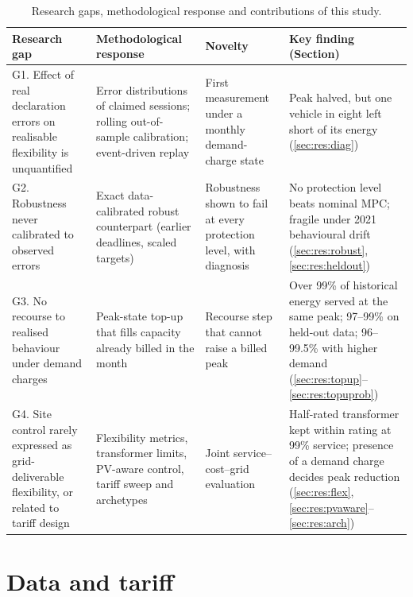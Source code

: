 \begin{table}[!htbp]
\centering
\caption{Research gaps, methodological response and contributions of this study.}
\label{tab:contrib}
\scriptsize
\setlength{\tabcolsep}{2.5pt}
\renewcommand{\arraystretch}{1.12}
\begin{tabular*}{\textwidth}{@{\extracolsep{\fill}}>{\raggedright\arraybackslash}p{}>{\raggedright\arraybackslash}p{}>{\raggedright\arraybackslash}p{}>{\raggedright\arraybackslash}p{}@{}}
\hline
Research gap & Methodological response & Novelty & Key finding (Section) \\
\hline
G1. Effect of real declaration errors on realisable flexibility is unquantified & Error distributions of claimed sessions; rolling out-of-sample calibration; event-driven replay & First measurement under a monthly demand-charge state & Peak halved, but one vehicle in eight left short of its energy (\ref{sec:res:diag}) \\
G2. Robustness never calibrated to observed errors & Exact data-calibrated robust counterpart (earlier deadlines, scaled targets) & Robustness shown to fail at every protection level, with diagnosis & No protection level beats nominal MPC; fragile under 2021 behavioural drift (\ref{sec:res:robust}, \ref{sec:res:heldout}) \\
G3. No recourse to realised behaviour under demand charges & Peak-state top-up that fills capacity already billed in the month & Recourse step that cannot raise a billed peak & Over 99\% of historical energy served at the same peak; 97--99\% on held-out data; 96--99.5\% with higher demand (\ref{sec:res:topup}--\ref{sec:res:topuprob}) \\
G4. Site control rarely expressed as grid-deliverable flexibility, or related to tariff design & Flexibility metrics, transformer limits, PV-aware control, tariff sweep and archetypes & Joint service--cost--grid evaluation & Half-rated transformer kept within rating at 99\% service; presence of a demand charge decides peak reduction (\ref{sec:res:flex}, \ref{sec:res:pvaware}--\ref{sec:res:arch}) \\
\hline
\end{tabular*}
\end{table}

\section{Data and tariff}\label{sec:data}
